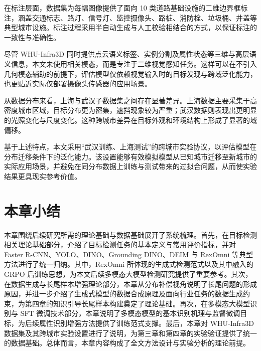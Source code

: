 在标注层面，数据集为每幅图像提供了面向 10 类道路基础设施的二维边界框标注，涵盖交通标志、路灯、信号灯、监控摄像头、路桩、消防栓、垃圾桶、井盖等典型城市设施。标注过程采用半自动生成与人工校验相结合的方式，以保证标注的一致性与准确性\cite{whu_infra3d_2025}。

尽管 WHU-Infra3D 同时提供点云语义标签、实例分割及属性状态等三维与高层语义信息，本文未使用相关模态，而是专注于二维视觉感知任务。这样可以在不引入几何模态辅助的前提下，评估模型仅依赖视觉输入时的目标发现与跨域泛化能力，也更贴近实际仅部署摄像头传感器的应用场景。

从数据分布来看，上海与武汉子数据集之间存在显著差异。上海数据主要采集于高密度城市区域，目标分布更为密集，遮挡现象较为严重；武汉数据则表现出更明显的光照变化与尺度变化。这种跨城市差异在目标外观和环境结构上形成了显著的域偏移\cite{whu_infra3d_2025}。

基于上述特点，本文采用“武汉训练、上海测试”的跨城市实验协议，以评估模型在分布迁移条件下的泛化能力。该设置能够有效模拟模型从已知城市迁移至新城市的实际应用场景，并避免在同分布数据上训练与测试带来的过拟合问题，从而使实验结果更具现实参考价值。

\section{本章小结}

本章围绕后续研究所需的理论基础与数据基础展开了系统梳理。首先，在目标检测相关理论基础部分，介绍了目标检测任务的基本定义与常用评价指标，并对 Faster R-CNN、YOLO、DINO、Grounding DINO、DEIM 与 RexOmni 等典型方法进行了统一归纳。其中，RexOmni 所体现的生成式检测范式以及其中融入的 GRPO 后训练思想，为本文后续多模态大模型检测研究提供了重要参考。其次，在数据生成与长尾样本增强理论部分，本章从分布补偿视角说明了长尾问题的形成原因，并进一步介绍了生成式模型的数据合成原理及面向行业任务的数据生成约束，为第四章的知识引导长尾样本构建奠定了理论基础。再次，在多模态大模型识别与 SFT 微调技术部分，本章说明了多模态模型的基本识别机理与监督微调目标，为后续属性识别增强方法提供了训练范式支撑。最后，本章对 WHU-Infra3D 数据集及其跨城市实验设置进行了说明，为第三章和第四章的实验验证提供了统一的数据基础。总体而言，本章内容构成了全文方法设计与实验分析的理论前提。
